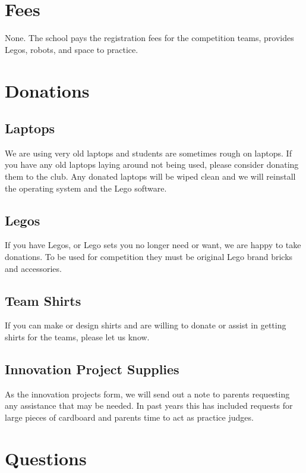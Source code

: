 \documentclass[letter]{article}
\begin{document}
\section{Fees}

None.  The school pays the registration fees for the competition teams, provides Legos, robots, and space to practice.

\hypertarget{donations}{%
\section{Donations}\label{donations}}

\subsection{Laptops}

We are using very old laptops and students are sometimes rough on laptops.  If you have any old laptops laying around not being used, please consider donating them to the club.  Any donated laptops will be wiped clean and we will reinstall the operating system and the Lego software.

\subsection{Legos}

If you have Legos, or Lego sets you no longer need or want, we are happy to take donations.  To be used for competition they must be original Lego brand bricks and accessories.

\subsection{Team Shirts}

If you can make or design shirts and are willing to donate or assist in getting shirts for the teams, please let us know.

\subsection{Innovation Project Supplies}

As the innovation projects form, we will send out a note to parents requesting any assistance that may be needed.  In past years this has included requests for large pieces of cardboard and parents time to act as practice judges.

\section{Questions}
\end{document}

